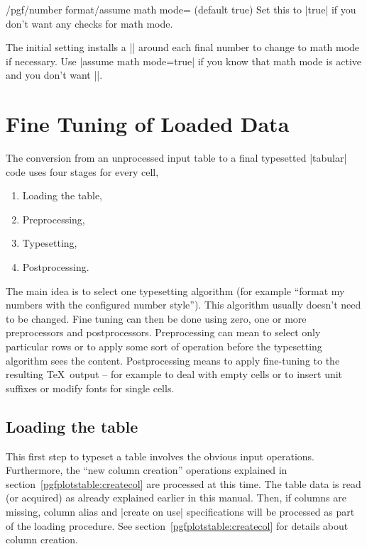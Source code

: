 \begin{key}{/pgf/number format/assume math mode= (default true)}
	Set this to |true| if you don't want any checks for math mode.
	
	The initial setting installs a |\pgfutilensuremath| around each final number to change to math mode if necessary. Use |assume math mode=true| if you know that math mode is active and you don't want |\pgfutilensuremath|.
\end{key}




\section{Fine Tuning of Loaded Data}
The conversion from an unprocessed input table to a final typesetted |tabular| code uses four stages for every cell,
\begin{enumerate}
	\item Loading the table,
	\item Preprocessing,
	\item Typesetting,
	\item Postprocessing.
\end{enumerate}
The main idea is to select one typesetting algorithm (for example ``format my numbers with the configured number style''). This algorithm usually doesn't need to be changed. Fine tuning can then be done using zero, one or more preprocessors and postprocessors. Preprocessing can mean to select only particular rows or to apply some sort of operation before the typesetting algorithm sees the content. Postprocessing means to apply fine-tuning to the resulting \TeX\ output -- for example to deal with empty cells or to insert unit suffixes or modify fonts for single cells.

\subsection{Loading the table}
This first step to typeset a table involves the obvious input operations. Furthermore, the ``new column creation'' operations explained in section~\ref{pgfplotstable:createcol} are processed at this time. The table data is read (or acquired) as already explained earlier in this manual. Then, if columns are missing, column alias and |create on use| specifications will be processed as part of the loading procedure. See section~\ref{pgfplotstable:createcol} for details about column creation.

